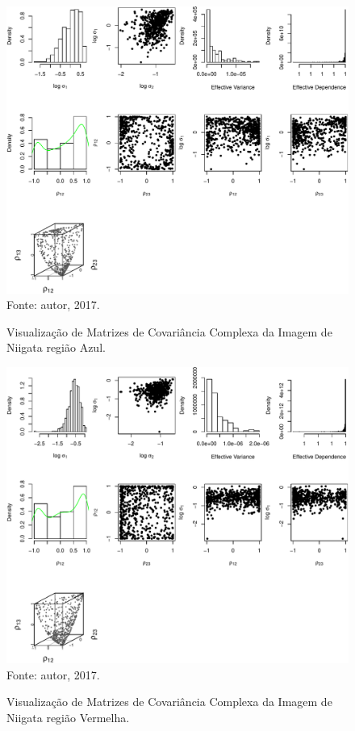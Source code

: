 \documentclass[a4paper,12pt]{article}
\begin{document}
\begin{figure}[ht]
\centering
\caption{Visualização de Matrizes de Covariância Complexa da Imagem de Niigata região Azul.}
\includegraphics[width=\linewidth]{../../Figuras/Amostras-Niigata/Niigata-Azul-500.pdf}\\
Fonte: autor, 2017.
\label{visNiigata2}
\end{figure}

\newpage

\begin{figure}[ht]
\centering
\caption{Visualização de Matrizes de Covariância Complexa da Imagem de Niigata região Vermelha.}
\includegraphics[width=\linewidth]{../../Figuras/Amostras-Niigata/Niigata-Vermelha-500.pdf}\\
Fonte: autor, 2017.
\label{visNiigata3}
\end{figure}
\end{document}
